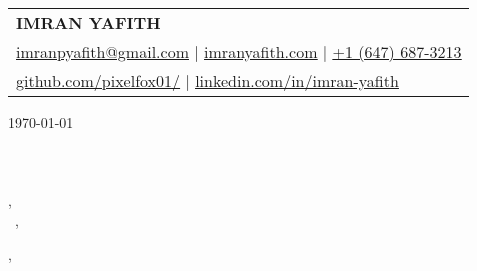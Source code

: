 \documentclass[a4paper, 12pt]{article}
\begin{document}
\color{imptextblack} %
\pagestyle{empty} %

\begin{tabularx}{\linewidth}{@{} Y @{}}
    \textcolor{imptextblack}{\Huge{\textbf{IMRAN YAFITH}}}                                    \\[6pt]
    \underline{\href{mailto:imranpyafith@gmail.com}{\raisebox{-0.05\height}{\faEnvelope} imranpyafith@gmail.com}} $|$
    \underline{\href{https://imranyafith.com/}{\raisebox{-0.05\height}{\faGlobe} imranyafith.com}} $|$
    \underline{\href{tel:+16476873213}{\raisebox{-0.05\height}{\faMobile} +1 (647) 687-3213}} \\
    \underline{\href{https://github.com/pixelfox01}{\raisebox{-0.05\height}{\faGithub} github.com/pixelfox01/}} $|$
    \underline{\href{https://www.linkedin.com/in/imran-yafith-95a437266/}{\raisebox{-0.05\height}{\faLinkedin} linkedin.com/in/imran-yafith}}
\end{tabularx}

\vspace{0.2in}

\today\\

\vspace{-0.1in}\recipient\\
\company\\
\street\\
\city, \state\ \zip\\

\vspace{-0.1in}\greeting\ \recipient,\\

\vspace{-0.1in}\setlength
\noindent

\vspace{0.2in}

\noindent\closer,


\noindent\myname
\end{document}
